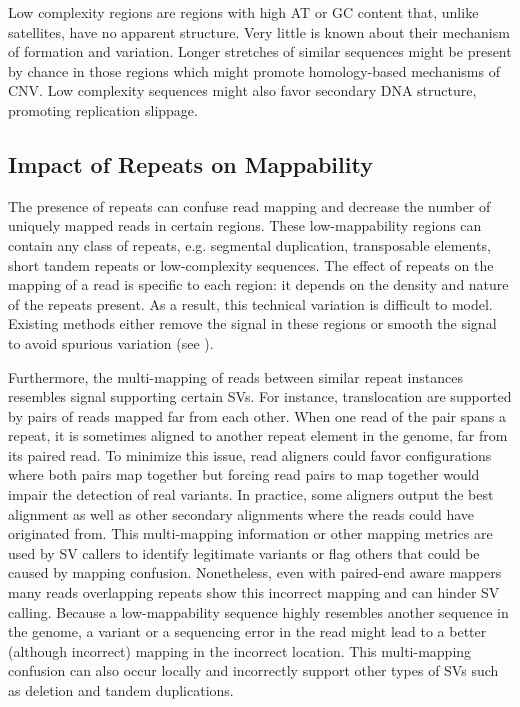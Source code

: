 Low complexity regions are regions with high AT or GC content that, unlike satellites, have no apparent structure.
Very little is known about their mechanism of formation and variation.
Longer stretches of similar sequences might be present by chance in those regions which might promote homology-based mechanisms of CNV.
Low complexity sequences might also favor secondary DNA structure, promoting replication slippage.

\subsection{Impact of Repeats on Mappability}
The presence of repeats can confuse read mapping and decrease the number of uniquely mapped reads in certain regions.
These low-mappability regions can contain any class of repeats, e.g. segmental duplication, transposable elements, short tandem repeats or low-complexity sequences.
The effect of repeats on the mapping of a read is specific to each region: it depends on the density and nature of the repeats present. 
As a result, this technical variation is difficult to model.
Existing methods either remove the signal in these regions or smooth the signal to avoid spurious variation (see ). 

Furthermore, the multi-mapping of reads between similar repeat instances resembles signal supporting certain SVs.
For instance, translocation are supported by pairs of reads mapped far from each other.
When one read of the pair spans a repeat, it is sometimes aligned to another repeat element in the genome, far from its paired read.
To minimize this issue, read aligners could favor configurations where both pairs map together but forcing read pairs to map together would impair the detection of real variants.
In practice, some aligners output the best alignment as well as other secondary alignments where the reads could have originated from.
This multi-mapping information or other mapping metrics are used by SV callers to identify legitimate variants or flag others that could be caused by mapping confusion.
Nonetheless, even with paired-end aware mappers many reads overlapping repeats show this incorrect mapping and can hinder SV calling.
Because a low-mappability sequence highly resembles another sequence in the genome, a variant or a sequencing error in the read might lead to a better (although incorrect) mapping in the incorrect location.
This multi-mapping confusion can also occur locally and incorrectly support other types of SVs such as deletion and tandem duplications.


